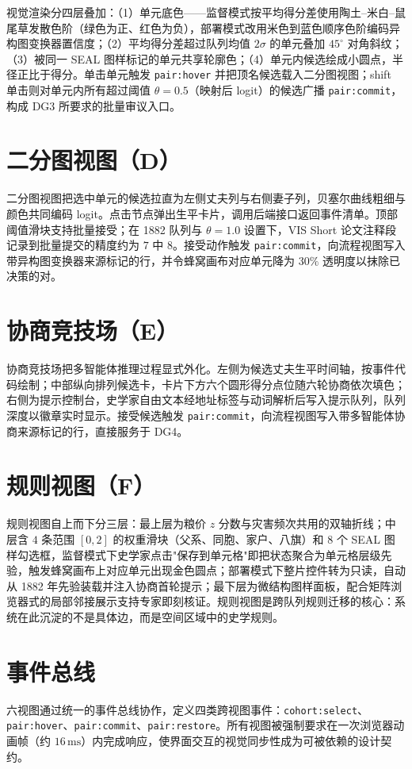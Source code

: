 视觉渲染分四层叠加：（1）单元底色——监督模式按平均得分差使用陶土--米白--鼠尾草发散色阶（绿色为正、红色为负），部署模式改用米色到蓝色顺序色阶编码异构图变换器置信度；（2）平均得分差超过队列均值 $2\sigma$ 的单元叠加 $45^{\circ}$ 对角斜纹；（3）被同一 SEAL 图样标记的单元共享轮廓色；（4）单元内候选绘成小圆点，半径正比于得分。单击单元触发 \texttt{pair:hover} 并把顶名候选载入二分图视图；shift 单击则对单元内所有超过阈值 $\theta=0.5$（映射后 logit）的候选广播 \texttt{pair:commit}，构成 DG3 所要求的批量审议入口。

\section{二分图视图（D）}\label{sec:vis-D}

二分图视图把选中单元的候选拉直为左侧丈夫列与右侧妻子列，贝塞尔曲线粗细与颜色共同编码 logit。点击节点弹出生平卡片，调用后端接口返回事件清单。顶部阈值滑块支持批量接受；在 1882 队列与 $\theta=1.0$ 设置下，VIS Short 论文注释段记录到批量提交的精度约为 $7$ 中 $8$。接受动作触发 \texttt{pair:commit}，向流程视图写入带异构图变换器来源标记的行，并令蜂窝画布对应单元降为 $30\%$ 透明度以抹除已决策的对。

\section{协商竞技场（E）}\label{sec:vis-E}

协商竞技场把多智能体推理过程显式外化\citep{amershi2014modeltracker,fails2003interactiveml}。左侧为候选丈夫生平时间轴，按事件代码绘制；中部纵向排列候选卡，卡片下方六个圆形得分点位随六轮协商依次填色；右侧为提示控制台，史学家自由文本经地址标签与动词解析后写入提示队列，队列深度以徽章实时显示。接受候选触发 \texttt{pair:commit}，向流程视图写入带多智能体协商来源标记的行，直接服务于 DG4。

\section{规则视图（F）}\label{sec:vis-F}

规则视图自上而下分三层：最上层为粮价 $z$ 分数与灾害频次共用的双轴折线；中层含 $4$ 条范围 $[0,2]$ 的权重滑块（父系、同胞、家户、八旗）和 $8$ 个 SEAL 图样勾选框，监督模式下史学家点击"保存到单元格"即把状态聚合为单元格层级先验，触发蜂窝画布上对应单元出现金色圆点；部署模式下整片控件转为只读，自动从 1882 年先验装载并注入协商首轮提示；最下层为微结构图样面板，配合矩阵浏览器式的局部邻接展示\citep{henry2006matrixexplorer,mcguffin2005genealogy}支持专家即刻核证。规则视图是跨队列规则迁移的核心：系统在此沉淀的不是具体边，而是空间区域中的史学规则。

\section{事件总线}\label{sec:vis-bus}

六视图通过统一的事件总线协作，定义四类跨视图事件：\texttt{cohort:select}、\texttt{pair:hover}、\texttt{pair:commit}、\texttt{pair:restore}。所有视图被强制要求在一次浏览器动画帧（约 $16\,\mathrm{ms}$）内完成响应，使界面交互的视觉同步性成为可被依赖的设计契约\citep{endert2017state}。
